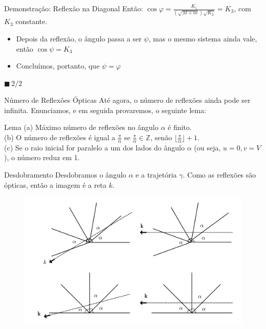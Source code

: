 \documentclass{beamer}
\begin{document}
\begin{frame}{Demonstração: Reflexão na Diagonal}
  Então:
  $\cos{\varphi} = \frac{K_1}{(\sqrt{M+m}) \sqrt{K_2}} = K_3$, com $K_3$ constante.
  \begin{itemize}
    \item Depois da reflexão, o ângulo passa a ser $\psi$, mas o mesmo sistema ainda vale, então $\cos{\psi} = K_3$
    \item Concluímos, portanto, que $\psi = \varphi$
  \end{itemize}
  $\blacksquare \, 2/2$
\end{frame}

\begin{frame}{Número de Reflexões Ópticas}
  Até agora, o número de reflexões ainda pode ser infinita. 
  Enunciamos, e em seguida provaremos, o seguinte lema:
  \begin{block}{Lema}
    (a) Máximo número de reflexões no ângulo $\alpha$ é finito.\\
    (b) O número de reflexões é igual a $\frac{\pi}{\alpha}$ se $\frac{\pi}{\alpha}\in\mathbb Z$, senão $\lfloor\frac{\pi}{\alpha}\rfloor+1$.\\
    (c) Se o raio inicial for paralelo a um dos lados do ângulo $\alpha$ (ou seja, $u=0,v=V$), o número reduz em 1.
  \end{block}
\end{frame}

\begin{frame}{Desdobramento}
  Desdobramos o ângulo $\alpha$ e a trajetória $\gamma$. Como as reflexões são ópticas, então a imagem é a reta $k$.
  \begin{figure}
    \centering
    \includegraphics[width=1\textwidth]{images/image-5.png}
  \end{figure}
\end{frame}
\end{document}
